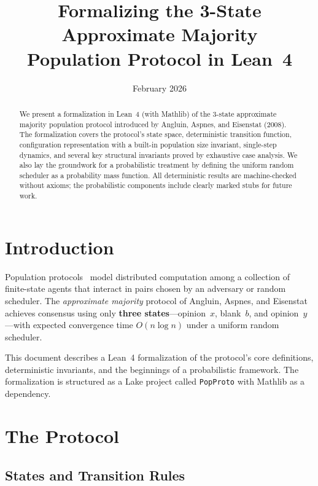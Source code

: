 \documentclass[11pt,a4paper]{article}
\title{Formalizing the 3-State Approximate Majority\\Population Protocol in Lean~4}
\author{}
\date{February 2026}
\begin{document}
\maketitle

\begin{abstract}
We present a formalization in Lean~4 (with Mathlib) of the 3-state approximate
majority population protocol introduced by Angluin, Aspnes, and Eisenstat
(2008).  The formalization covers the protocol's state space, deterministic
transition function, configuration representation with a built-in population
size invariant, single-step dynamics, and several key structural invariants
proved by exhaustive case analysis.  We also lay the groundwork for a
probabilistic treatment by defining the uniform random scheduler as a
probability mass function.  All deterministic results are machine-checked
without axioms; the probabilistic components include clearly marked stubs
for future work.
\end{abstract}

\tableofcontents

\section{Introduction}
\label{sec:intro}

Population protocols~\cite{AngluinADFP2006} model distributed computation
among a collection of finite-state agents that interact in pairs chosen by
an adversary or random scheduler.  The \emph{approximate majority} protocol
of Angluin, Aspnes, and Eisenstat~\cite{AngluinAE2008} achieves consensus
using only \textbf{three states}---opinion~$x$, blank~$b$, and
opinion~$y$---with expected convergence time $O(n \log n)$ under a uniform
random scheduler.

This document describes a Lean~4 formalization of the protocol's core
definitions, deterministic invariants, and the beginnings of a probabilistic
framework.  The formalization is structured as a Lake project called
\texttt{PopProto} with Mathlib as a dependency.

\section{The Protocol}
\label{sec:protocol}

\subsection{States and Transition Rules}
\end{document}
